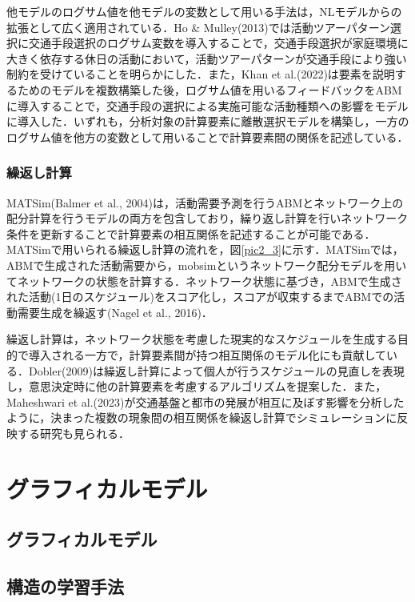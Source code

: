 他モデルのログサム値を他モデルの変数として用いる手法は，NLモデルからの拡張として広く適用されている．Ho \& Mulley(2013)では活動ツアーパターン選択に交通手段選択のログサム変数を導入することで，交通手段選択が家庭環境に大きく依存する休日の活動において，活動ツアーパターンが交通手段により強い制約を受けていることを明らかにした．また，Khan et al.(2022)は要素を説明するためのモデルを複数構築した後，ログサム値を用いるフィードバックをABMに導入することで，交通手段の選択による実施可能な活動種類への影響をモデルに導入した．いずれも，分析対象の計算要素に離散選択モデルを構築し，一方のログサム値を他方の変数として用いることで計算要素間の関係を記述している．

\subsubsection{繰返し計算}
MATSim(Balmer et al., 2004)は，活動需要予測を行うABMとネットワーク上の配分計算を行うモデルの両方を包含しており，繰り返し計算を行いネットワーク条件を更新することで計算要素の相互関係を記述することが可能である．MATSimで用いられる繰返し計算の流れを，図\ref{pic2_3}に示す．MATSimでは，ABMで生成された活動需要から，mobsimというネットワーク配分モデルを用いてネットワークの状態を計算する．ネットワーク状態に基づき，ABMで生成された活動(1日のスケジュール)をスコア化し，スコアが収束するまでABMでの活動需要生成を繰返す(Nagel et al., 2016)．

繰返し計算は，ネットワーク状態を考慮した現実的なスケジュールを生成する目的で導入される一方で，計算要素間が持つ相互関係のモデル化にも貢献している．Dobler(2009)は繰返し計算によって個人が行うスケジュールの見直しを表現し，意思決定時に他の計算要素を考慮するアルゴリズムを提案した．また，Maheshwari et al.(2023)が交通基盤と都市の発展が相互に及ぼす影響を分析したように，決まった複数の現象間の相互関係を繰返し計算でシミュレーションに反映する研究も見られる．




\section{グラフィカルモデル}\label{2.3}

\subsection{グラフィカルモデル}\label{2.3.1}

\subsection{構造の学習手法}\label{2.3.2}
